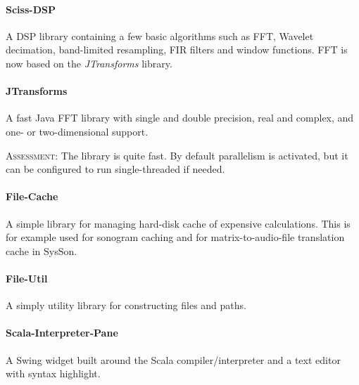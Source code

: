 \documentclass[11pt,a4paper]{article}
\newcommand{\software}[1]{\textit{#1}}
\newcommand{\sysson}[0]{SysSon}
\newcommand{\assessment}[0]{\textsc{Assessment:}}
\begin{document}
\paragraph{Sciss-DSP}

A DSP library containing a few basic algorithms such as FFT, Wavelet decimation, band-limited resampling, FIR filters and window functions. FFT is now based on the \software{JTransforms} library.

\paragraph{JTransforms}

A fast Java FFT library with single and double precision, real and complex, and one- or two-dimensional support.

\assessment{} The library is quite fast. By default parallelism is activated, but it can be configured to run single-threaded if needed.

\paragraph{File-Cache}

A simple library for managing hard-disk cache of expensive calculations. This is for example used for sonogram caching and for matrix-to-audio-file translation cache in \sysson{}. 

\paragraph{File-Util}

A simply utility library for constructing files and paths.

\paragraph{Scala-Interpreter-Pane}

A Swing widget built around the Scala compiler/interpreter and a text editor with syntax highlight.
\end{document}
